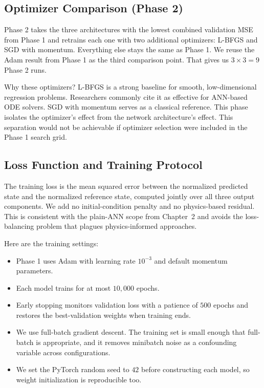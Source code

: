\subsection{Optimizer Comparison (Phase 2)}

Phase 2 takes the three architectures with the lowest combined validation MSE from Phase 1 and retrains each one with two additional optimizers: L-BFGS and SGD with momentum. Everything else stays the same as Phase 1. We reuse the Adam result from Phase 1 as the third comparison point. That gives us $3 \times 3 = 9$ Phase 2 runs.

Why these optimizers? L-BFGS is a strong baseline for smooth, low-dimensional regression problems. Researchers commonly cite it as effective for ANN-based ODE solvers. SGD with momentum serves as a classical reference. This phase isolates the optimizer's effect from the network architecture's effect. This separation would not be achievable if optimizer selection were included in the Phase 1 search grid.

\subsection{Loss Function and Training Protocol}

The training loss is the mean squared error between the normalized predicted state and the normalized reference state, computed jointly over all three output components. We add no initial-condition penalty and no physics-based residual. This is consistent with the plain-ANN scope from Chapter~2 and avoids the loss-balancing problem that plagues physics-informed approaches.

Here are the training settings:

\begin{itemize}
    \item Phase 1 uses Adam with learning rate $10^{-3}$ and default momentum parameters.
    \item Each model trains for at most $10{,}000$ epochs.
    \item Early stopping monitors validation loss with a patience of $500$ epochs and restores the best-validation weights when training ends.
    \item We use full-batch gradient descent. The training set is small enough that full-batch is appropriate, and it removes minibatch noise as a confounding variable across configurations.
    \item We set the PyTorch random seed to $42$ before constructing each model, so weight initialization is reproducible too.
\end{itemize}


